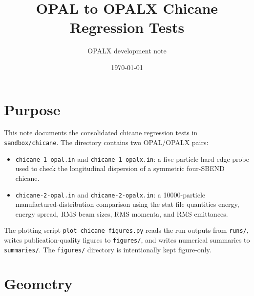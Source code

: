 \documentclass[11pt,a4paper]{article}
\title{OPAL to OPALX Chicane Regression Tests}
\author{OPALX development note}
\date{\today}
\begin{document}
\maketitle

\section{Purpose}

This note documents the consolidated chicane regression tests in
\texttt{sandbox/chicane}.  The directory contains two OPAL/OPALX pairs:
\begin{itemize}
  \item \texttt{chicane-1-opal.in} and \texttt{chicane-1-opalx.in}: a
        five-particle hard-edge probe used to check the longitudinal
        dispersion of a symmetric four-SBEND chicane.
  \item \texttt{chicane-2-opal.in} and \texttt{chicane-2-opalx.in}: a
        10000-particle manufactured-distribution comparison using the stat
        file quantities energy, energy spread, RMS beam sizes, RMS momenta,
        and RMS emittances.
\end{itemize}
The plotting script \texttt{plot\_chicane\_figures.py} reads the run outputs
from \texttt{runs/}, writes publication-quality figures to \texttt{figures/},
and writes numerical summaries to \texttt{summaries/}.  The \texttt{figures/}
directory is intentionally kept figure-only.

\section{Geometry}
\end{document}
